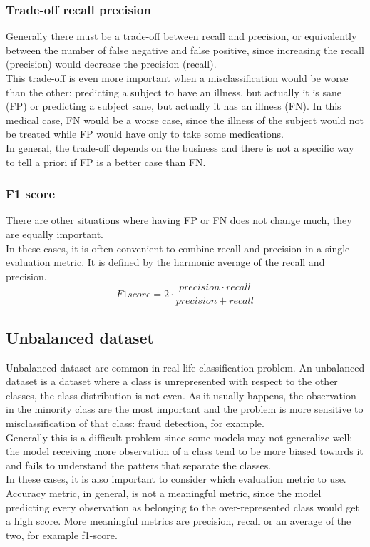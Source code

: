 \subsubsection{Trade-off recall precision}
Generally there must be a trade-off between recall and precision, or equivalently between the number of false negative and false positive, since increasing the recall (precision) would decrease the precision (recall). \\

This trade-off is even more important when a misclassification would be worse than the other: predicting a subject to have an illness, but actually it is sane (\gls{FP}) or predicting a subject sane, but actually it has an illness (\gls{FN}). In this medical case, \gls{FN} would be a worse case, since the illness of the subject would not be treated while \gls{FP} would have only to take some medications. \\
In general, the trade-off depends on the business and there is not a specific way to tell a priori if \gls{FP} is a better case than \gls{FN}.

\subsubsection{F1 score}
There are other situations where having \gls{FP} or \gls{FN} does not change much, they are equally important.\\
In these cases, it is often convenient to combine recall and precision in a single evaluation metric. It is defined by the harmonic average of the recall and precision.
\[
F1score = 2\cdot \frac{precision \cdot recall}{precision + recall}
\]

\subsection{Unbalanced dataset}
Unbalanced dataset are common in real life classification problem. An unbalanced dataset is a dataset where a class is unrepresented with respect to the other classes, the class distribution is not even. As it usually happens, the observation in the minority class are the most important and the problem is more sensitive to misclassification of that class: fraud detection, for example.\\

Generally this is a difficult problem since some models may not generalize well: the model receiving more observation of a class tend to be more biased towards it and fails to understand the patters that separate the classes. \\
In these cases, it is also important to consider which evaluation metric to use. Accuracy metric, in general, is not a meaningful metric, since the model predicting every observation as belonging to the over-represented class would get a high score. More meaningful metrics are precision, recall or an average of the two, for example f1-score.\\

